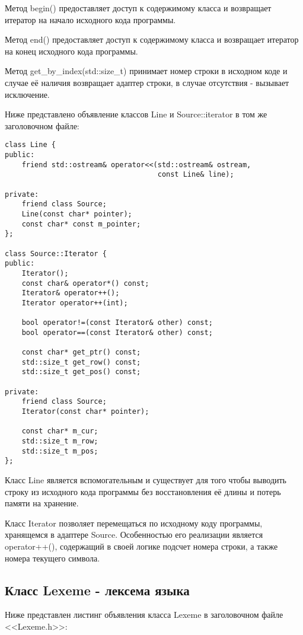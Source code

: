 Метод begin() предоставляет доступ к содержимому класса
и возвращает итератор на начало исходного кода программы.

Метод end() предоставляет доступ к содержимому класса 
и возвращает итератор на конец исходного кода программы.

Метод get\_by\_index(std::size\_t) принимает номер 
строки в исходном коде и случае её наличия возвращает
адаптер строки, в случае отсутствия - вызывает
исключение.

Ниже представлено объявление
классов Line и Source::iterator в том же
заголовочном файле:

\begin{verbatim}
class Line {
public:
    friend std::ostream& operator<<(std::ostream& ostream, 
                                    const Line& line);

private:
    friend class Source;
    Line(const char* pointer);
    const char* const m_pointer;
};

class Source::Iterator {
public:
    Iterator();
    const char& operator*() const;
    Iterator& operator++();
    Iterator operator++(int);

    bool operator!=(const Iterator& other) const;
    bool operator==(const Iterator& other) const;

    const char* get_ptr() const;
    std::size_t get_row() const;
    std::size_t get_pos() const;

private:
    friend class Source;
    Iterator(const char* pointer);

    const char* m_cur;
    std::size_t m_row;
    std::size_t m_pos;
};
\end{verbatim}

Класс Line является вспомогательным и существует для того
чтобы выводить строку из исходного кода программы без 
восстановления её длины и потерь памяти на хранение.

Класс Iterator позволяет перемещаться по исходному коду
программы, хранящемся в адаптере Source. Особенностью его
реализации является operator++(), содержащий в своей логике
подсчет номера строки, а также номера текущего символа.

\subsection{Класс Lexeme - лексема языка}

Ниже представлен листинг объявления класса Lexeme
в заголовочном файле <<Lexeme.h>>:

